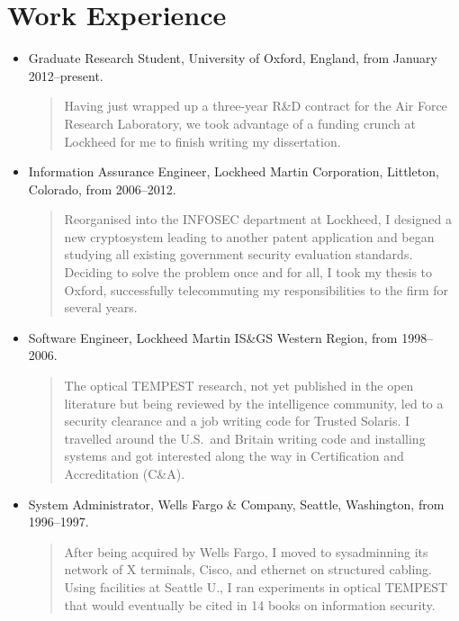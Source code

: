 \documentclass[letterpaper]{article}
\begin{document}
\section*{Work Experience} %

\begin{itemize}
	\item Graduate Research Student, University of Oxford, England, from January 2012--present.

		\begin{quote}\vspace{-2mm}
			Having just wrapped up a three-year R\&D contract for the Air Force Research
			Laboratory, we took advantage of a funding crunch at Lockheed for me to finish writing
			my dissertation.
		\end{quote}

	\item Information Assurance Engineer, Lockheed Martin Corporation, Littleton, Colorado, from
		2006--2012.

		\begin{quote}\vspace{-2mm}
			Reorganised into the INFOSEC department at Lockheed, I designed a new cryptosystem
			leading to another patent application and began studying all existing government
			security evaluation standards.  Deciding to solve the problem once and for all, I
			took my thesis to Oxford, successfully telecommuting my responsibilities to the firm
			for several years.
		\end{quote}

	\item Software Engineer, Lockheed Martin IS\&GS Western Region, from 1998--2006.

		\begin{quote}\vspace{-2mm}
			The optical TEMPEST research, not yet published in the open literature but being
			reviewed by the intelligence community, led to a security clearance and a job writing
			code for Trusted Solaris.  I travelled around the U.S.\ and Britain writing code and
			installing systems and got interested along the way in Certification and
			Accreditation (C\&A).
		\end{quote}

	\item System Administrator, Wells Fargo \& Company, Seattle, Washington, from  1996--1997.

		\begin{quote}\vspace{-2mm}
			After being acquired by Wells Fargo, I moved to sysadminning its network
			of X terminals, Cisco, and ethernet on structured cabling.  Using facilities
			at Seattle U., I ran experiments in optical TEMPEST that would eventually
			be cited in 14 books on information security.
		\end{quote}


\end{itemize}
\end{document}
